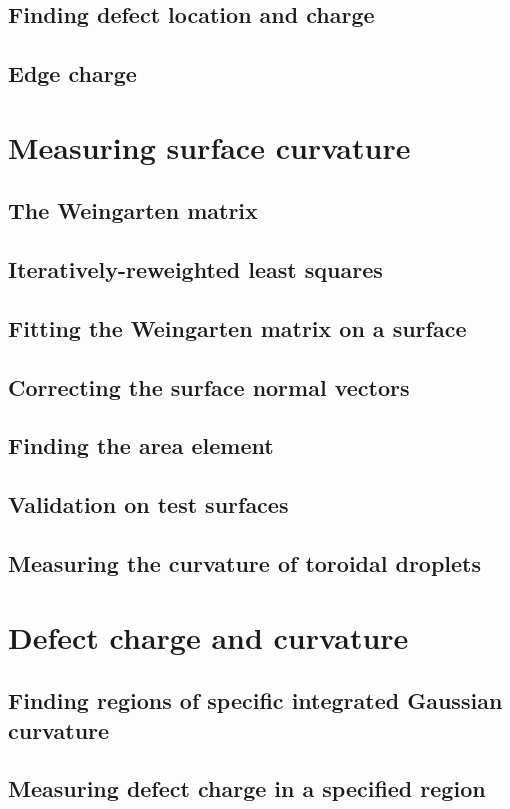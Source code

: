 \subsection{Finding defect location and charge}
\subsection{Edge charge}

\section{Measuring surface curvature}
\subsection{The Weingarten matrix}
\subsection{Iteratively-reweighted least squares}
\subsection{Fitting the Weingarten matrix on a surface}
\subsection{Correcting the surface normal vectors}
\subsection{Finding the area element}
\subsection{Validation on test surfaces}
\subsection{Measuring the curvature of toroidal droplets}

\section{Defect charge and curvature}
\subsection{Finding regions of specific integrated Gaussian curvature}
\subsection{Measuring defect charge in a specified region}
